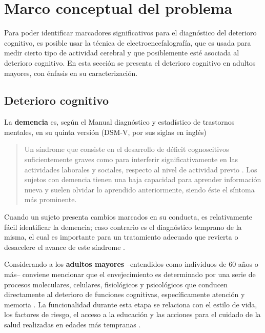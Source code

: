 
\chapter{Marco conceptual del problema}

Para poder identificar marcadores significativos para el diagnóstico del deterioro cognitivo, es 
posible usar la técnica de electroencefalografía, que es usada para medir cierto tipo de actividad 
cerebral y que posiblemente esté asociada al deterioro cognitivo. 
%
En esta sección se presenta el deterioro cognitivo en adultos mayores, con énfasis en su 
caracterización.


\section{Deterioro cognitivo}

La \textbf{demencia} es, según el Manual diagnóstico y estadístico de trastornos mentales, en su 
quinta versión (DSM-V, por sus siglas en inglés)
\begin{quote}
Un síndrome que consiste en el desarrollo de déficit cognoscitivos suficientemente graves como para 
interferir significativamente en las actividades laborales y sociales, respecto al nivel de 
actividad previo \cite{DCM5}.
%
Los sujetos con demencia tienen una baja capacidad para aprender información nueva y suelen olvidar 
lo aprendido anteriormente, siendo éste el síntoma más prominente.
\end{quote}

Cuando un sujeto presenta cambios marcados en su conducta, es relativamente fácil identificar la 
demencia; caso contrario es el diagnóstico temprano de la misma, el cual es importante para un 
tratamiento adecuado que revierta o desacelere el avance de este síndrome \cite{Knopman01}.

Considerando a los \textbf{adultos mayores} --entendidos como individuos de 60 años o más--
conviene mencionar que el envejecimiento es determinado por una serie de procesos moleculares, 
celulares, fisiológicos y psicológicos que conducen directamente al deterioro de funciones 
cognitivas, específicamente atención y memoria \cite{Park09}.
%
La funcionalidad durante esta etapa se relaciona con el estilo de vida, los factores de riesgo, el 
acceso a la educación y las acciones para el cuidado de la salud realizadas en edades más 
tempranas \cite{Sanhueza14}.

